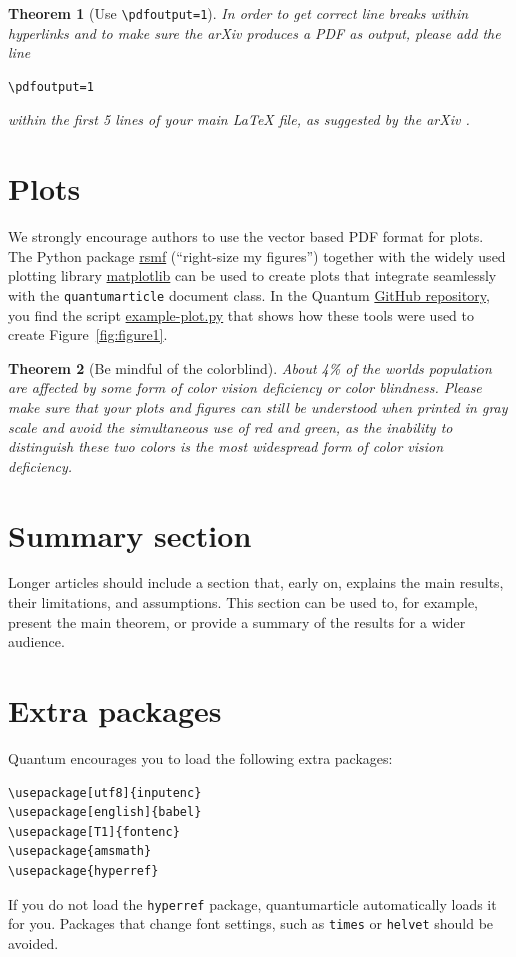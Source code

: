 \documentclass[a4paper,twocolumn,11pt]{quantumarticle}
\newtheorem{theorem}{Theorem}
\begin{document}
\begin{theorem}[Use \texttt{\textbackslash pdfoutput=1}]
  In order to get correct line breaks within hyperlinks and to make sure the arXiv produces a PDF as output, please add the line
\begin{verbatim}
\pdfoutput=1
\end{verbatim}
  within the first 5 lines of your main LaTeX file, as suggested by the arXiv \cite{arxivpdfoutput}.
\end{theorem}

\section{Plots}
\label{sec:plots}
We strongly encourage authors to use the vector based PDF format for plots. The Python package \href{https://pypi.org/project/rsmf/}{rsmf} (``right-size my figures'') together with the widely used plotting library \href{https://matplotlib.org/}{matplotlib} can be used to create plots that integrate seamlessly with the \texttt{quantumarticle} document class. In the Quantum \href{https://github.com/quantum-journal/quantum-journal/}{GitHub repository}, you find the script \href{https://raw.githubusercontent.com/quantum-journal/quantum-journal/master/example-plot.py}{example-plot.py} that shows how these tools were used to create Figure~\ref{fig:figure1}.


\begin{theorem}[Be mindful of the colorblind]
  About 4\% of the worlds population are affected by some form of color vision deficiency or color blindness.
  Please make sure that your plots and figures can still be understood when printed in gray scale and avoid the simultaneous use of red and green, as the inability to distinguish these two colors is the most widespread form of color vision deficiency.
\end{theorem}

\section{Summary section}
Longer articles should include a section that, early on, explains the main results, their limitations, and assumptions.
This section can be used to, for example, present the main theorem, or provide a summary of the results for a wider audience.

\section{Extra packages}
Quantum encourages you to load the following extra packages:
\begin{verbatim}
\usepackage[utf8]{inputenc}
\usepackage[english]{babel}
\usepackage[T1]{fontenc}
\usepackage{amsmath}
\usepackage{hyperref}
\end{verbatim}
If you do not load the \texttt{hyperref} package, quantumarticle automatically loads it for you.
Packages that change font settings, such as \texttt{times} or \texttt{helvet} should be avoided.
\end{document}
